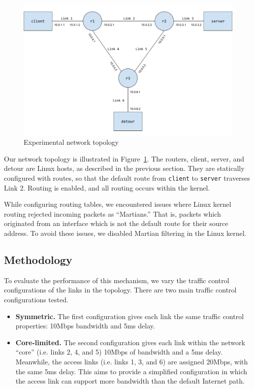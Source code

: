 \documentclass{cwru}
\begin{document}
\begin{figure}
  \centering
  \includegraphics[width=\textwidth]{figures/Topology.pdf}
  \caption{Experimental network topology}
  \label{fig:topo}
\end{figure}

Our network topology is illustrated in Figure~\ref{fig:topo}. The routers,
client, server, and detour are Linux hosts, as described in the previous
section. They are statically configured with routes, so that the default route
from \texttt{client} to \texttt{server} traverses Link 2. Routing is enabled,
and all routing occurs within the kernel.

While configuring routing tables, we encountered issues where Linux kernel
routing rejected incoming packets as ``Martians.'' That is, packets which
originated from an interface which is not the default route for their source
address. To avoid these issues, we disabled Martian filtering in the Linux
kernel.

\subsection{Methodology}

To evaluate the performance of this mechanism, we vary the traffic control
configurations of the links in the topology. There are two main traffic control
configurations tested.

\begin{itemize}
\item \textbf{Symmetric.} The first configuration gives each link the same
  traffic control properties: 10Mbps bandwidth and 5ms delay.
\item \textbf{Core-limited.} The second configuration gives each link within the
  network ``core'' (i.e. links 2, 4, and 5) 10Mbps of bandwidth and a 5ms delay.
  Meanwhile, the access links (i.e. links 1, 3, and 6) are assigned 20Mbps, with
  the same 5ms delay. This aims to provide a simplified configuration in which
  the access link can support more bandwidth than the default Internet path.
\end{itemize}
\end{document}
